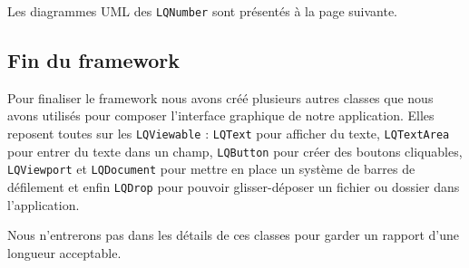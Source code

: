 \documentclass[twoside]{report}
\begin{document}
Les diagrammes UML des \verb!LQNumber! sont présentés à la page suivante.

\subsection{Fin du framework}

Pour finaliser le framework nous avons créé plusieurs autres classes que nous avons utilisés pour composer l'interface graphique de notre application. Elles reposent toutes sur les \verb!LQViewable! : \verb!LQText! pour afficher du texte, \verb!LQTextArea! pour entrer du texte dans un champ, \verb!LQButton! pour créer des boutons cliquables, \verb!LQViewport! et \verb!LQDocument! pour mettre en place un système de barres de défilement et enfin \verb!LQDrop! pour pouvoir glisser-déposer un fichier ou dossier dans l'application.

Nous n'entrerons pas dans les détails de ces classes pour garder un rapport d'une longueur acceptable.

\newpage
\end{document}
